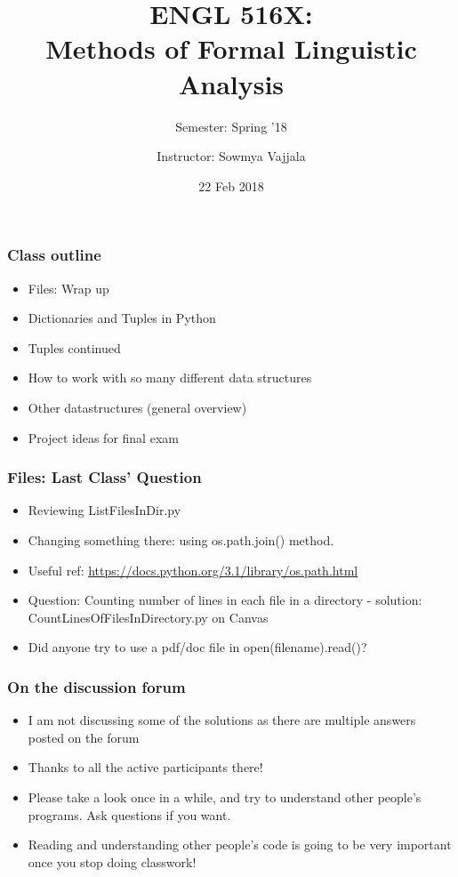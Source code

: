 \documentclass{beamer}
\author[Sowmya Vajjala]{Instructor: Sowmya Vajjala}
\title[ENGL 516X]{ENGL 516X: \\ Methods of Formal Linguistic Analysis}
\subtitle{Semester: Spring '18}
\date{22 Feb 2018}
\institute{Iowa State University, USA}
\begin{document}
\begin{frame}\titlepage
\end{frame}

\begin{frame}%
\frametitle{Class outline}
\begin{itemize}
\item Files: Wrap up
\item Dictionaries and Tuples in Python %
\item Tuples continued %
\item How to work with so many different data structures %
\item Other datastructures (general overview) %
\item Project ideas for final exam %
\end{itemize}
\end{frame}

\begin{frame}[fragile] %
\frametitle{Files: Last Class' Question}
\begin{itemize}
\item Reviewing ListFilesInDir.py \pause
\item Changing something there: using os.path.join() method.
\item Useful ref: \url{https://docs.python.org/3.1/library/os.path.html} \pause
\item Question: Counting number of lines in each file in a directory - solution: CountLinesOfFilesInDirectory.py on Canvas \pause
\item Did anyone try to use a pdf/doc file in open(filename).read()?
\end{itemize}
\end{frame} 

\begin{frame}[fragile] %
\frametitle{On the discussion forum}
\begin{itemize}
\item I am not discussing some of the solutions as there are multiple answers posted on the forum
\item Thanks to all the active participants there!
\item Please take a look once in a while, and try to understand other people's programs. Ask questions if you want. 
\item Reading and understanding other people's code is going to be very important once you stop doing classwork!
\end{itemize}
\end{frame} 
\end{document}
